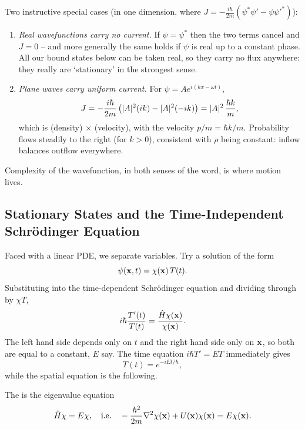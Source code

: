 \documentclass[a4paper]{scrartcl}
\begin{document}
\begin{example}
    Two instructive special cases (in one dimension, where $J = -\frac{i\hbar}{2m}(\psi^* \psi' - \psi \psi'^*)$):
    \begin{enumerate}[label=(\roman*)]
        \item \emph{Real wavefunctions carry no current.} If $\psi = \psi^*$ then the two terms cancel and $J = 0$ -- and more generally the same holds if $\psi$ is real up to a constant phase. All our bound states below can be taken real, so they carry no flux anywhere: they really are `stationary' in the strongest sense.
        \item \emph{Plane waves carry uniform current.} For $\psi = A e^{i(kx - \omega t)}$,
        $$
        J = -\frac{i \hbar}{2m}\left( \lvert A\rvert^2 (ik) - \lvert A\rvert^2 (-ik) \right) = \lvert A\rvert^2 \, \frac{\hbar k}{m},
        $$
        which is (density) $\times$ (velocity), with the velocity $p/m = \hbar k/m$. Probability flows steadily to the right (for $k > 0$), consistent with $\rho$ being constant: inflow balances outflow everywhere.
    \end{enumerate}
    Complexity of the wavefunction, in both senses of the word, is where motion lives.
\end{example}

\subsection{Stationary States and the Time-Independent Schr\"odinger Equation}

Faced with a linear PDE, we separate variables. Try a solution of the form
$$
\psi(\mathbf{x}, t) = \chi(\mathbf{x}) \, T(t).
$$
Substituting into the time-dependent Schr\"odinger equation and dividing through by $\chi T$,
$$
i \hbar \frac{T'(t)}{T(t)} = \frac{\hat{H} \chi(\mathbf{x})}{\chi(\mathbf{x})}.
$$
The left hand side depends only on $t$ and the right hand side only on $\mathbf{x}$, so both are equal to a constant, $E$ say. The time equation $i \hbar T' = E T$ immediately gives
$$
T(t) = e^{-iEt/\hbar},
$$
while the spatial equation is the following.

\begin{definition}
    The  is the eigenvalue equation
    $$
    \hat{H} \chi = E \chi, \quad \text{i.e.} \quad -\frac{\hbar^2}{2m} \nabla^2 \chi(\mathbf{x}) + U(\mathbf{x}) \chi(\mathbf{x}) = E \chi(\mathbf{x}).
    $$
\end{definition}
\end{document}
